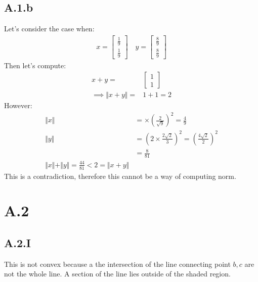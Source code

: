 \documentclass[]{article}
\begin{document}
    \subsection*{A.1.b}
        Let's consider the case when: 
        \begin{align*}\tag{A.1.b.1}\label{eqn:A.1.b.1}
            x = \begin{bmatrix}
                \frac{1}{9} \\ \frac{1}{9}
            \end{bmatrix}
            \quad 
            y = \begin{bmatrix}
                \frac{8}{9} \\ \frac{8}{9}
            \end{bmatrix}
        \end{align*}
        Then let's compute: 
        \begin{align*}\tag{A.1.b.2}\label{eqn:A.1.b.2}
            x + y =& \begin{bmatrix}
            1 \\ 1
            \end{bmatrix}
            \\
            \implies 
            \Vert x + y\Vert =& 1 +1 = 2        
        \end{align*}
        However: 
        \begin{align*}\tag{A.1.b.3}\label{eqn:A.1.b.3}
            \Vert x\Vert & = \times \left(
                \frac{2}{\sqrt{9}}
            \right)^{2} = \frac{4}{9}
            \\
            \Vert y\Vert &= \left(
                2\times\frac{2 \sqrt{2}}{3}
            \right)^2 = \left(
                \frac{4 \sqrt{2}}{2}
            \right)^2
            \\
            &= \frac{8}{81}
            \\
            \Vert x\Vert + \Vert y\Vert = \frac{44}{81} < 2 = \Vert x + y\Vert
        \end{align*}
        This is a contradiction, therefore this cannot be a way of computing norm. 
\section*{A.2}
    \subsection*{A.2.I}
        This is not convex because a the intersection of the line connecting point $b, c$ are not the whole line. A section of the line lies outside of the shaded region. 
\end{document}
